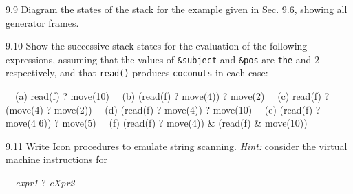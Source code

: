 9.9 Diagram the states of the stack for the example given in Sec. 9.6,
showing all generator frames.

9.10 Show the successive stack states for the evaluation of the
following expressions, assuming that the values of \texttt{\&subject}
and \texttt{\&pos} are \texttt{{\textquotedbl}the{\textquotedbl}} and
2 respectively, and that \texttt{read()} produces
\texttt{{\textquotedbl}coconuts{\textquotedbl}} in each case:

\ \ (a) read(f) ? move(10)\newline
\ \ (b) (read(f) ? move(4)) ? move(2)\newline
\ \ (c) read(f) ? (move(4) ? move(2))\newline
\ \ (d) (read(f) ? move(4)) ? move(10)\newline
\ \ (e) (read(f) ? move(4 {\textbar} 6)) ? move(5)\newline
\ \ (f) (read(f) ? move(4)) \& (read(f) \& move(10))

9.11 Write Icon procedures to emulate string scanning. \textit{Hint:}
consider the virtual machine instructions for

{\ttfamily\mdseries
\textit{\ \ expr1 }? \textit{eXpr2}}
